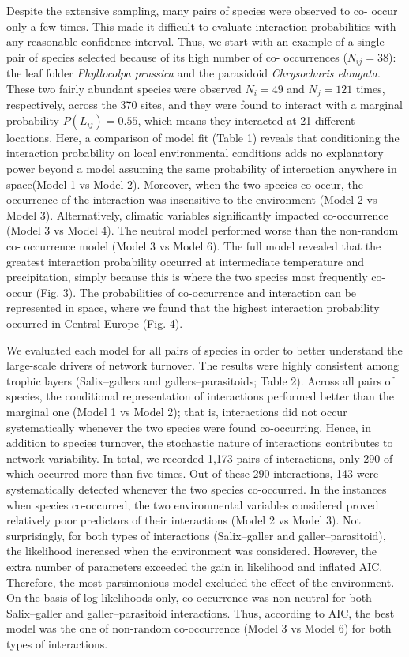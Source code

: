\documentclass[12pt]{article}
\begin{document}
Despite the extensive sampling, many pairs of species were observed to co-
occur only a few times. This made it difficult to evaluate interaction
probabilities with any reasonable confidence interval. Thus, we start with an
example of a single pair of species selected because of its high number of co-
occurrences ($N_{ij}=38$): the leaf folder \textit{Phyllocolpa prussica} and
the parasidoid \textit{Chrysocharis elongata}. These two fairly abundant
species were observed $N_i=49$ and $N_j=121$ times, respectively, across the
370 sites, and they were found to interact with a marginal probability
$P(L_{ij})=0.55$, which means they interacted at 21 different locations. Here,
a comparison of model fit (Table 1) reveals that conditioning the interaction
probability on local environmental conditions adds no explanatory power beyond
a model assuming the same probability of interaction anywhere in space(Model 1
vs Model 2). Moreover, when the two species co-occur, the occurrence of the
interaction was insensitive to the environment (Model 2 vs Model 3).
Alternatively, climatic variables significantly impacted co-occurrence (Model
3 vs Model 4). The neutral model performed worse than the non-random co-
occurrence model (Model 3 vs Model 6). The full model revealed that the
greatest interaction probability occurred at intermediate temperature and
precipitation, simply because this is where the two species most frequently
co-occur (Fig. 3). The probabilities of co-occurrence and interaction can be
represented in space, where we found that the highest interaction probability
occurred in Central Europe (Fig. 4).

We evaluated each model for all pairs of species in order to better understand
the large-scale drivers of network turnover. The results were highly consistent
among trophic layers (Salix–gallers and gallers–parasitoids; Table 2). Across
all pairs of species, the conditional representation of interactions performed
better than the marginal one (Model 1 vs Model 2); that is, interactions did
not occur systematically whenever the two species were found co-occurring.
Hence, in addition to species turnover, the stochastic nature of interactions
contributes to network variability. In total, we recorded 1,173 pairs of
interactions, only 290 of which occurred more than five times. Out of these 290
interactions, 143 were systematically detected whenever the two species co-occurred.
In the instances when species co-occurred, the two environmental
variables considered proved relatively poor predictors of their interactions
(Model 2 vs Model 3). Not surprisingly, for both types of interactions
(Salix–galler and galler–parasitoid), the likelihood increased when the
environment was considered. However, the extra number of parameters exceeded the
gain in likelihood and inflated AIC. Therefore, the most parsimonious model
excluded the effect of the environment. On the basis of log-likelihoods only,
co-occurrence was non-neutral for both Salix–galler and
galler–parasitoid interactions. Thus, according to AIC, the best model was the
one of non-random co-occurrence (Model 3 vs Model 6) for both types of
interactions.
\end{document}
